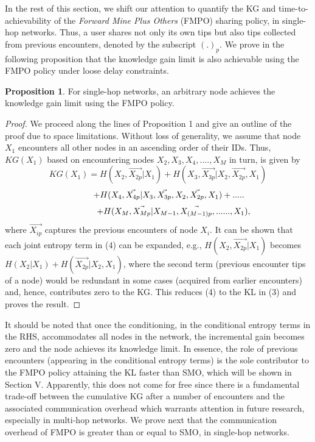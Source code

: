 \documentclass[conference]{IEEEtran}
\theoremstyle{definition}
\newtheorem{prop}{Proposition}
\begin{document}
In the rest of this section, we shift our attention to quantify the KG and time-to-achievability of the {\it Forward Mine Plus Others} (FMPO) sharing policy, in single-hop networks. Thus, a user shares not only its own tips but also tips collected from previous encounters, denoted by the subscript $(.)_p$. We prove in the following proposition that the knowledge gain limit is also achievable using the FMPO policy under loose delay constraints.




\begin{prop}
For single-hop networks, an arbitrary node achieves the knowledge gain limit using the FMPO policy.
\end{prop}
\vspace{-0.2 cm}
\begin{proof}
We proceed along the lines of Proposition 1 and give an outline of the proof due to space limitations. Without loss of generality, we assume that node $X_1$ encounters all other nodes in an ascending order of their IDs. Thus, $KG(X_1)$ based on encountering nodes $X_2, X_3, X_4,...., X_M$ in turn, is given by
\begin{equation}
KG(X_1) = H(X_2, \vec{X_{2p}}|X_1) + H(X_3, \vec{X_{3p}}|X_2, \vec{X_{2p}}, X_1) 
\nonumber
\end{equation} 
\begin{equation}
\hspace*{0.9 cm} + H(X_4, \vec{X_{4p}}|X_3, \vec{X_{3p}}, X_2, \vec{X_{2p}}, X_1)+ .....
\nonumber
\end{equation}
\begin{equation}
\hspace*{1.3 cm} + H(X_M, \vec{X_{Mp}}|X_{M-1}, \vec{X_{(M-1)p}} ,......, X_1),
\end{equation}
\noindent where $\vec{X_{ip}}$ captures the previous encounters of node $X_i$. It can 
be shown that each joint entropy term in (4) can be expanded, 
e.g., $H(X_2, \vec{X_{2p}}|X_1)$ becomes $H(X_2|X_1) + H(\vec{X_{2p}}|X_2, X_1)$, where 
the second term (previous encounter tips of a node) would be redundant in some cases (acquired from earlier encounters) and, hence, contributes zero to the KG. This reduces (4) to the KL in (3) and proves the result.
\end{proof}
It should be noted that once the conditioning, in the conditional entropy terms in the RHS, accommodates all nodes in the network, the incremental gain becomes zero and the node achieves its knowledge limit. In essence, the role of previous encounters (appearing in the conditional entropy terms) is the sole contributor to the FMPO policy attaining the KL faster than SMO, which will be shown in Section V. Apparently, this does not come for free since there is a fundamental trade-off between the cumulative KG after a number of encounters and the associated communication overhead which warrants attention in future research, especially in multi-hop networks. We prove next that the communication overhead of FMPO is greater than or equal to SMO, in single-hop networks.
\end{document}
